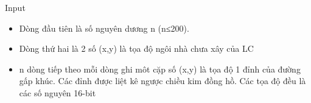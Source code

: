 Input
\begin{itemize}
	\item     Dòng đầu tiên là số nguyên dương n (n≤200).   
	\item     Dòng thứ hai là 2 số (x,y) là tọa độ ngôi nhà chưa xây của LC   
	\item     n dòng tiếp theo mỗi dòng ghi môt cặp số (x,y) là tọa độ 1 đỉnh của đường gấp khúc. Các đỉnh được liệt kê ngược chiều kim đồng hồ. Các tọa độ đều là các số nguyên 16-bit   
\end{itemize}